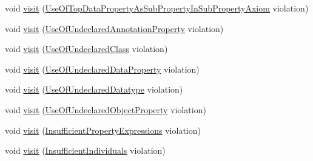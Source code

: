 \begin{DoxyCompactItemize}
\item 
void \hyperlink{interfaceorg_1_1semanticweb_1_1owlapi_1_1profiles_1_1_o_w_l2_d_l_profile_violation_visitor_aad6b052e334f8adfb8ee4352b7ba9300}{visit} (\hyperlink{classorg_1_1semanticweb_1_1owlapi_1_1profiles_1_1_use_of_top_data_property_as_sub_property_in_sub_property_axiom}{Use\-Of\-Top\-Data\-Property\-As\-Sub\-Property\-In\-Sub\-Property\-Axiom} violation)
\item 
void \hyperlink{interfaceorg_1_1semanticweb_1_1owlapi_1_1profiles_1_1_o_w_l2_d_l_profile_violation_visitor_a9839f1b9b9184e9a5b877928992d1778}{visit} (\hyperlink{classorg_1_1semanticweb_1_1owlapi_1_1profiles_1_1_use_of_undeclared_annotation_property}{Use\-Of\-Undeclared\-Annotation\-Property} violation)
\item 
void \hyperlink{interfaceorg_1_1semanticweb_1_1owlapi_1_1profiles_1_1_o_w_l2_d_l_profile_violation_visitor_a163f4e6226c2fb632d6a887b1d9a84d0}{visit} (\hyperlink{classorg_1_1semanticweb_1_1owlapi_1_1profiles_1_1_use_of_undeclared_class}{Use\-Of\-Undeclared\-Class} violation)
\item 
void \hyperlink{interfaceorg_1_1semanticweb_1_1owlapi_1_1profiles_1_1_o_w_l2_d_l_profile_violation_visitor_a50d2adf4006d4215a355983dfc4dc8e3}{visit} (\hyperlink{classorg_1_1semanticweb_1_1owlapi_1_1profiles_1_1_use_of_undeclared_data_property}{Use\-Of\-Undeclared\-Data\-Property} violation)
\item 
void \hyperlink{interfaceorg_1_1semanticweb_1_1owlapi_1_1profiles_1_1_o_w_l2_d_l_profile_violation_visitor_ade1444cf38e915e9b610f89119f1eb5b}{visit} (\hyperlink{classorg_1_1semanticweb_1_1owlapi_1_1profiles_1_1_use_of_undeclared_datatype}{Use\-Of\-Undeclared\-Datatype} violation)
\item 
void \hyperlink{interfaceorg_1_1semanticweb_1_1owlapi_1_1profiles_1_1_o_w_l2_d_l_profile_violation_visitor_ab646fb1a555adaf66e3fa917717427cf}{visit} (\hyperlink{classorg_1_1semanticweb_1_1owlapi_1_1profiles_1_1_use_of_undeclared_object_property}{Use\-Of\-Undeclared\-Object\-Property} violation)
\item 
void \hyperlink{interfaceorg_1_1semanticweb_1_1owlapi_1_1profiles_1_1_o_w_l2_d_l_profile_violation_visitor_a6d789929f7b20eb7f52f88eb12e76c6c}{visit} (\hyperlink{classorg_1_1semanticweb_1_1owlapi_1_1profiles_1_1_insufficient_property_expressions}{Insufficient\-Property\-Expressions} violation)
\item 
void \hyperlink{interfaceorg_1_1semanticweb_1_1owlapi_1_1profiles_1_1_o_w_l2_d_l_profile_violation_visitor_a662e4e6771fb23411b6295ec7d5885e1}{visit} (\hyperlink{classorg_1_1semanticweb_1_1owlapi_1_1profiles_1_1_insufficient_individuals}{Insufficient\-Individuals} violation)

\end{DoxyCompactItemize}
